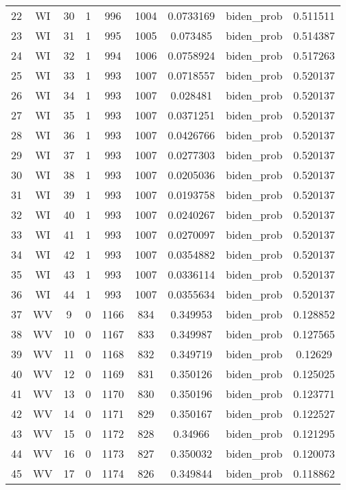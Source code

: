 \documentclass[12pt,a4paper]{article}
\begin{document}
\begin{tabular}{r|cccccccc}
	22 & WI & 30 & 1 & 996 & 1004 & 0.0733169 & biden\_prob & 0.511511 \\
	23 & WI & 31 & 1 & 995 & 1005 & 0.073485 & biden\_prob & 0.514387 \\
	24 & WI & 32 & 1 & 994 & 1006 & 0.0758924 & biden\_prob & 0.517263 \\
	25 & WI & 33 & 1 & 993 & 1007 & 0.0718557 & biden\_prob & 0.520137 \\
	26 & WI & 34 & 1 & 993 & 1007 & 0.028481 & biden\_prob & 0.520137 \\
	27 & WI & 35 & 1 & 993 & 1007 & 0.0371251 & biden\_prob & 0.520137 \\
	28 & WI & 36 & 1 & 993 & 1007 & 0.0426766 & biden\_prob & 0.520137 \\
	29 & WI & 37 & 1 & 993 & 1007 & 0.0277303 & biden\_prob & 0.520137 \\
	30 & WI & 38 & 1 & 993 & 1007 & 0.0205036 & biden\_prob & 0.520137 \\
	31 & WI & 39 & 1 & 993 & 1007 & 0.0193758 & biden\_prob & 0.520137 \\
	32 & WI & 40 & 1 & 993 & 1007 & 0.0240267 & biden\_prob & 0.520137 \\
	33 & WI & 41 & 1 & 993 & 1007 & 0.0270097 & biden\_prob & 0.520137 \\
	34 & WI & 42 & 1 & 993 & 1007 & 0.0354882 & biden\_prob & 0.520137 \\
	35 & WI & 43 & 1 & 993 & 1007 & 0.0336114 & biden\_prob & 0.520137 \\
	36 & WI & 44 & 1 & 993 & 1007 & 0.0355634 & biden\_prob & 0.520137 \\
	37 & WV & 9 & 0 & 1166 & 834 & 0.349953 & biden\_prob & 0.128852 \\
	38 & WV & 10 & 0 & 1167 & 833 & 0.349987 & biden\_prob & 0.127565 \\
	39 & WV & 11 & 0 & 1168 & 832 & 0.349719 & biden\_prob & 0.12629 \\
	40 & WV & 12 & 0 & 1169 & 831 & 0.350126 & biden\_prob & 0.125025 \\
	41 & WV & 13 & 0 & 1170 & 830 & 0.350196 & biden\_prob & 0.123771 \\
	42 & WV & 14 & 0 & 1171 & 829 & 0.350167 & biden\_prob & 0.122527 \\
	43 & WV & 15 & 0 & 1172 & 828 & 0.34966 & biden\_prob & 0.121295 \\
	44 & WV & 16 & 0 & 1173 & 827 & 0.350032 & biden\_prob & 0.120073 \\
	45 & WV & 17 & 0 & 1174 & 826 & 0.349844 & biden\_prob & 0.118862 \\

\end{tabular}
\end{document}
